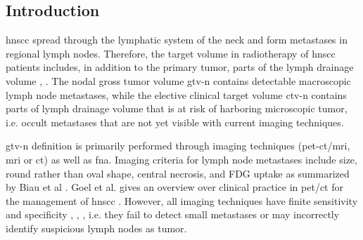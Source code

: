 \documentclass[\relativeRoot/main.tex]{subfiles}
\begin{document}
\subsection{Introduction}
\label{subsec:dataset:paper:introduction}

\Gls{hnscc} spread through the lymphatic system of the neck and form metastases in regional lymph nodes. Therefore, the target volume in radiotherapy of \gls{hnscc} patients includes, in addition to the primary tumor, parts of the lymph drainage volume \cite{biau_selection_2019}, \cite{grosu_target_2015}. The nodal gross tumor volume \gls{gtv-n} contains detectable macroscopic lymph node metastases, while the elective clinical target volume \gls{ctv-n} contains parts of lymph drainage volume that is at risk of harboring microscopic tumor, i.e. occult metastases that are not yet visible with current imaging techniques.

\Gls{gtv-n} definition is primarily performed through imaging techniques (\gls{pet}-\gls{ct}/\gls{mri}, \gls{mri} or \gls{ct}) as well as \gls{fna}. Imaging criteria for lymph node metastases include size, round rather than oval shape, central necrosis, and FDG uptake as summarized by Biau et al \cite{biau_selection_2019}. Goel et al. gives an overview over clinical practice in \gls{pet}/\gls{ct} for the management of \gls{hnscc} \cite{goel_clinical_2017}. However, all imaging techniques have finite sensitivity and specificity \cite{park_diagnostic_2020}, \cite{jensen_imaging_2021}, \cite{rohde_18f-fluoro-deoxy-glucose-positron_2014}, i.e. they fail to detect small metastases or may incorrectly identify suspicious lymph nodes as tumor.
\end{document}

